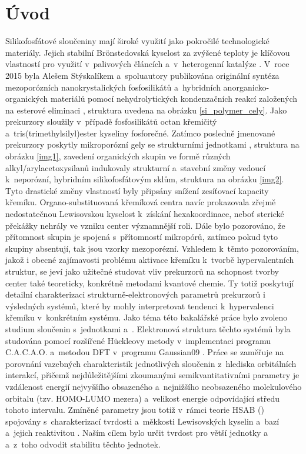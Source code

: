 \documentclass[
  printed, %
  table,   %
  lof,     %
  lot,     %
  oneside,
]{fithesis3}
\begin{document}
\chapter{Úvod}
Silikofosfátové sloučeniny mají široké využití jako pokročilé technologické materiály. Jejich stabilní Brönstedovská kyselost za zvýšené teploty je klíčovou vlastností pro využití v~palivových článcích a~v~heterogenní katalýze \cite{korotcenkov2013handbook}\cite{Fougret2001295}. V~roce 2015 byla Alešem Stýskalíkem a~spoluautory publikována originální syntéza mezoporózních  nanokrystalických  fosfosilikátů a~hybridních anorganicko-organických materiálů pomocí nehydrolytických kondenzačních reakcí založených na esterové eliminaci \cite{1306716}, struktura uvedena na obrázku \ref{si_polymer_cely}. Jako prekurzory sloužily v~případě fosfosilikátů octan křemičitý a~tris(trimethylsilyl)ester kyseliny fosforečné. Zatímco posledně jmenované prekurzory poskytly mikroporózní gely se strukturními jednotkami , struktura na obrázku \ref{img1}, zavedení organických skupin ve formě různých alkyl/arylacetoxysilanů indukovaly strukturní  a~stavební změny vedoucí k~neporózní, hybridním silikofosfátovým sklům\cite{1316862}, struktura na obrázku \ref{img2}. Tyto drastické změny vlastností byly připsány snížení zesíťovací kapacity křemíku. Organo-substituovaná křemíková centra navíc prokazovala zřejmě nedostatečnou Lewisovskou kyselost k~získání hexakoordinace, neboť sterické překážky nehrály ve vzniku  center významnější roli. Dále bylo pozorováno, že přítomnost skupin  je spojená s~přítomností mikropórů, zatímco pokud tyto skupiny absentují, tak jsou vzorky mezoporézní.
Vzhledem k~těmto pozorováním, jakož i obecné zajímavosti problému aktivace křemíku k~tvorbě hypervalentních struktur,\cite{rendler2005hypervalent} se jeví jako užitečné studovat vliv prekurzorů na schopnost tvorby center  také teoreticky, konkrétně metodami kvantové chemie. Ty totiž poskytují detailní charakterizaci strukturně-elektronových parametrů prekurzorů i výsledných systémů, které by mohly interpretovat tendenci k~hypervalenci křemíku v~konkrétním systému. Jako téma této bakalářské práce bylo zvoleno studium sloučenin s~jednotkami  a~. Elektronová struktura těchto systémů byla studována pomocí rozšířené Hückleovy metody v~implementaci programu C.A.C.A.O. \cite{cacao} a~metodou DFT v~programu Gaussian09 \cite{g09}. Práce se zaměřuje na porovnání vazebných charakteristik jednotlivých sloučenin z~hlediska orbitálních interakcí, přičemž nejdůležitějšími zkoumanými semikvantitativními parametry je  vzdálenost energií nejvyššího obsazeného a~nejnižšího neobsazeného molekulového orbitalu (tzv. HOMO-LUMO mezera) a~velikost energie odpovídající středu tohoto intervalu. Zmíněné parametry jsou totiž v~rámci teorie HSAB () spojovány s~charakterizací tvrdosti a~měkkosti Lewisovských kyselin a~bazí a~jejich reaktivitou \cite{pearson1986absolute}. Naším cílem bylo určit tvrdost pro větší jednotky  a~ a~z~toho odvodit stabilitu těchto jednotek. 
\end{document}
